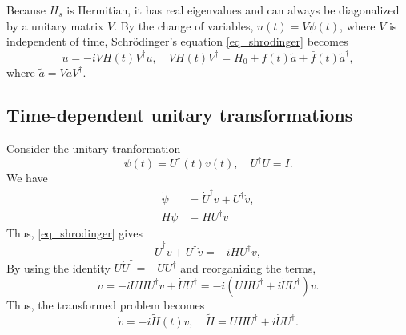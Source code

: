 \documentclass[11pt]{article}
\begin{document}
Because $H_s$ is Hermitian, it has real eigenvalues and can always be diagonalized by a unitary
matrix $V$. By the change of variables, $u(t)=V \psi(t)$, where $V$ is independent of time, Schr\"odinger's equation
\eqref{eq_shrodinger} becomes
\[
\dot{u} = -i VH(t)V^\dag u,\quad VH(t)V^\dag = H_0 + f(t)\tilde{a} + \bar{f}(t)\tilde{a}^\dag,
\]
where $\tilde{a}=V a V^\dag$.


\subsection{Time-dependent unitary transformations}
Consider the unitary tranformation
\[
\psi(t) = U^{\dag}(t)v(t),\quad U^\dag U = I.
\]
We have
\begin{align*}
\dot{\psi} &= \dot{U}^\dag v + U^\dag \dot{v},\\
H\psi &= H U^\dag v
\end{align*}
Thus, \eqref{eq_shrodinger} gives
\[
\dot{U}^\dag v + U^\dag \dot{v} = -i H U^\dag v,
\]
By using the identity $U \dot{U}^\dag = - \dot{U} U^\dag$ and reorganizing the terms,
\[
\dot{v} = -i U H U^\dag v + \dot{U} U^\dag = -i\left( UHU^\dag + i \dot{U} U^\dag \right) v.
\]
Thus, the transformed problem becomes
\[
\dot{v} = -i \tilde{H}(t) v,\quad \tilde{H} = UHU^\dag + i \dot{U} U^\dag.
\]

\end{document}
